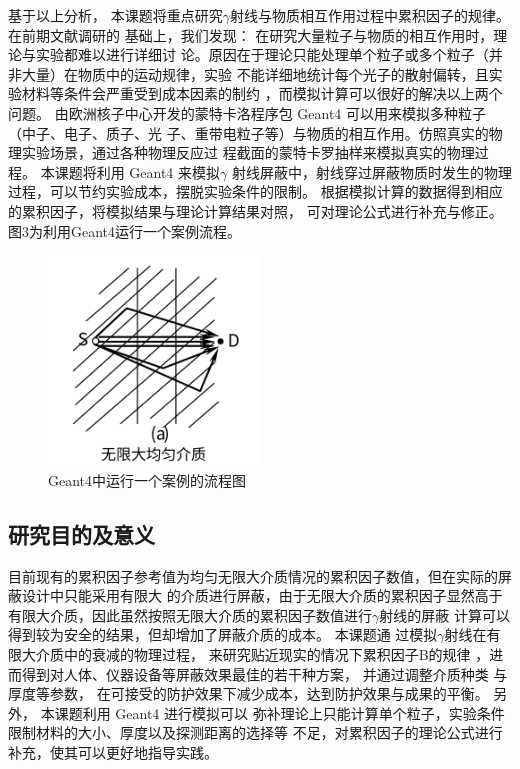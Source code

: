 基于以上分析， 本课题将重点研究$\gamma$射线与物质相互作用过程中累积因子的规律。
在前期文献调研的
基础上，我们发现： 在研究大量粒子与物质的相互作用时，理论与实验都难以进行详细讨
论。原因在于理论只能处理单个粒子或多个粒子（并非大量）在物质中的运动规律，实验
不能详细地统计每个光子的散射偏转，且实验材料等条件会严重受到成本因素的制约
，而模拟计算可以很好的解决以上两个问题。 由欧洲核子中心开发的蒙特卡洛程序包
Geant4 可以用来模拟多种粒子（中子、电子、质子、光
子、重带电粒子等）与物质的相互作用。仿照真实的物理实验场景，通过各种物理反应过
程截面的蒙特卡罗抽样来模拟真实的物理过程。 本课题将利用 Geant4 来模拟$\gamma$
射线屏蔽中，射线穿过屏蔽物质时发生的物理过程，可以节约实验成本，摆脱实验条件的限制。
根据模拟计算的数据得到相应的累积因子，将模拟结果与理论计算结果对照，
可对理论公式进行补充与修正。图3为利用Geant4运行一个案例流程。
\begin{figure}[h]
    \centering
    \includegraphics[width = 0.5\textwidth]{图片3.png}
    \caption{Geant4中运行一个案例的流程图}
    \end{figure}
\subsection{研究目的及意义}
目前现有的累积因子参考值为均匀无限大介质情况的累积因子数值，但在实际的屏
蔽设计中只能采用有限大
的介质进行屏蔽，由于无限大介质的累积因子显然高于有限大介质，因此虽然按照无限大介质的累积因子数值进行$\gamma$射线的屏蔽
计算可以得到较为安全的结果，但却增加了屏蔽介质的成本\cite{2008Overview}。
本课题通
过模拟$\gamma$射线在有限大介质中的衰减的物理过程，
来研究贴近现实的情况下累积因子B的规律
，进而得到对人体、仪器设备等屏蔽效果最佳的若干种方案， 并通过调整介质种类
与厚度等参数， 在可接受的防护效果下减少成本，达到防护效果与成果的平衡。 
另外， 本课题利用 Geant4 进行模拟可以
弥补理论上只能计算单个粒子，实验条件限制材料的大小、厚度以及探测距离的选择等
不足，对累积因子的理论公式进行补充，使其可以更好地指导实践。

